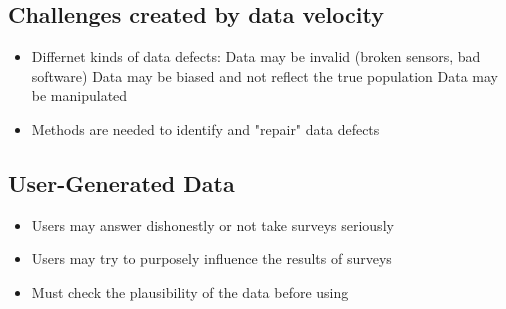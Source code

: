 \documentclass[10pt,a4paper]{scrreprt}
\begin{document}
\subsection{Challenges created by data velocity}
\begin{itemize}
	\item Differnet kinds of data defects:
		\subitem Data may be invalid (broken sensors, bad software)
		\subitem Data may be biased and not reflect the true population
		\subitem Data may be manipulated
	\item Methods are needed to identify and "repair" data defects
\end{itemize}

\subsection{User-Generated Data}
\begin{itemize}
	\item Users may answer dishonestly or not take surveys seriously
	\item Users may try to purposely influence the results of surveys
	\item Must check the plausibility of the data before using	
\end{itemize}


	
\end{document}
